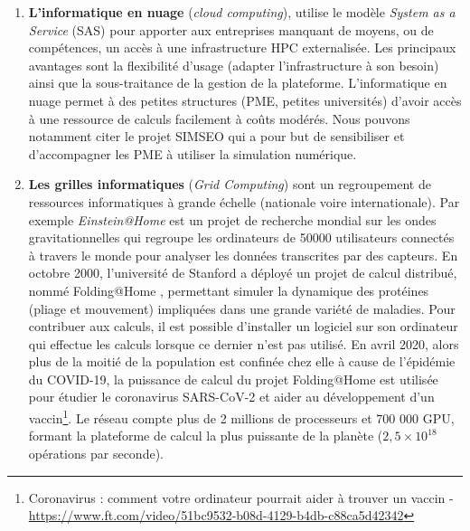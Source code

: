 \begin{enumerate}
        \item \textbf{L'informatique en nuage} (\textit{cloud computing}),  utilise le modèle \textit{System as a Service} (SAS) pour apporter aux entreprises manquant de moyens, ou de compétences, un accès à une infrastructure HPC externalisée. Les principaux avantages sont la flexibilité d'usage (adapter l'infrastructure à son besoin) ainsi que la sous-traitance de la gestion de la plateforme. L'informatique en nuage permet  à des petites structures (PME, petites universités) d'avoir accès à une ressource de calculs facilement à coûts modérés. Nous pouvons notamment citer le projet SIMSEO \cite{Saguez2016} qui a pour but de sensibiliser et d'accompagner les PME à utiliser la simulation numérique. %
        
        \item \textbf{Les grilles informatiques} (\textit{Grid Computing}) sont un regroupement de ressources informatiques à grande échelle (nationale voire internationale). Par exemple \textit{Einstein@Home} \cite{Abbott2009} est un projet de recherche mondial sur les ondes gravitationnelles  qui regroupe les ordinateurs de 50000 utilisateurs connectés à travers le monde pour analyser les données transcrites par des capteurs. En octobre 2000, l'université de Stanford a déployé un projet de calcul distribué, nommé Folding@Home \cite{Larson2009}, permettant simuler la dynamique des protéines (pliage et mouvement) impliquées dans une grande variété de maladies. Pour contribuer aux calculs, il est possible d'installer un logiciel sur son ordinateur qui effectue les calculs lorsque ce dernier n'est pas utilisé. En avril 2020, alors plus de la moitié de la population est confinée chez elle à cause de l'épidémie du COVID-19, la puissance de calcul du projet Folding@Home est utilisée pour étudier le coronavirus SARS-CoV-2 et aider au développement d'un vaccin\footnote{Coronavirus : comment votre ordinateur pourrait aider à trouver un vaccin - \url{https://www.ft.com/video/51bc9532-b08d-4129-b4db-c88ca5d42342}}. Le réseau compte plus de 2 millions de processeurs et  700 000 GPU, formant la plateforme de calcul la plus puissante de la planète ($2,5 \times 10^{18}$ opérations par seconde). 
        
    \end{enumerate}
        
